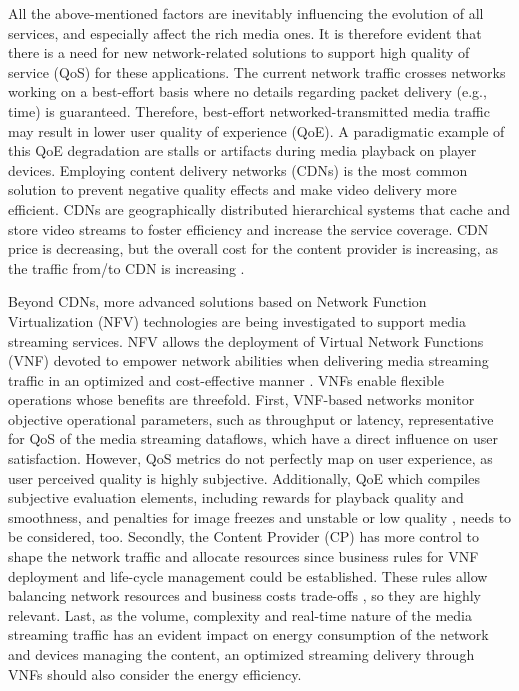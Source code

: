 All the above-mentioned factors are inevitably influencing the evolution of all services, and especially affect the rich media ones. It is therefore evident that there is a need for new network-related solutions to support high quality of service (QoS) for these applications. The current network traffic crosses networks working on a best-effort basis where no details regarding packet delivery (e.g., time) is guaranteed. Therefore, best-effort networked-transmitted media traffic may result in lower user quality of experience (QoE). A paradigmatic example of this QoE degradation are stalls or artifacts during media playback on player devices. Employing content delivery networks (CDNs) is the most common solution to prevent negative quality effects and make video delivery more efficient. CDNs are geographically distributed hierarchical systems that cache and store video streams to foster efficiency and increase the service coverage. CDN price is decreasing, but the overall cost for the content provider is increasing, as the traffic from/to CDN is increasing \cite{Rayburn2020}.

Beyond CDNs, more advanced solutions based on Network Function Virtualization (NFV) technologies \cite{Han2015} are being investigated to support media streaming services. NFV allows the deployment of Virtual Network Functions (VNF) devoted to empower network abilities when delivering media streaming traffic in an optimized and cost-effective manner \cite{Jahromi2018, Dieye2018}. VNFs enable flexible operations whose benefits are threefold. First, VNF-based networks monitor objective operational parameters, such as throughput or latency, representative for QoS of the media streaming dataflows, which have a direct influence on user satisfaction.
However, QoS metrics do not perfectly map on user experience, as user perceived quality is highly subjective. Additionally, QoE which compiles subjective evaluation elements, including rewards for playback quality and smoothness, and penalties for image freezes and unstable or low quality \cite{Kim2010, Alreshoodi2013}, needs to be considered, too.
Secondly, the Content Provider (CP) has more control to shape the network traffic and allocate resources since business rules for VNF deployment and life-cycle management could be established. These rules allow balancing network resources and business costs trade-offs \cite{Hernandez2015}, so they are highly relevant.
Last, as the volume, complexity and real-time nature of the media streaming traffic has an evident impact on energy consumption of the network and devices managing the content, an optimized streaming delivery through VNFs should also consider the energy efficiency.
	
